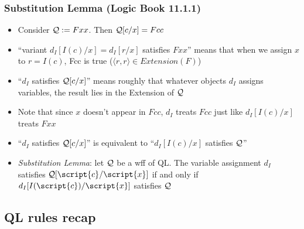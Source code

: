 \begin{frame}
\frametitle{Substitution Lemma (Logic Book 11.1.1)}

\begin{itemize}[<+->]

\item Consider $\metav{Q} := Fxx$. Then $\metav{Q}\substitute{x}{c} = Fcc$

\item  ``variant $d_I [I(c) /x]=d_I [r/x]$ satisfies $Fxx$'' means that when we assign $x$ to $r=I(c)$, Fcc is true ($\langle r, r \rangle \in Extension(F)$) %

\item ``$d_I$ satisfies $\metav{Q}\substitute{x}{c}$'' means roughly that whatever objects $d_I$ assigns variables, the result lies in the Extension of $\metav{Q}$

\item Note that since $x$ doesn't appear in $Fcc$, $d_I$ treats $Fcc$ just like $d_I [I(c) /x]$ treats $Fxx$




\item ``$d_I$ satisfies $\metav{Q}\substitute{x}{c}$'' is equivalent to ``$d_I [I(c) /x]$ satisfies $\metav{Q}$''

\item \emph{Substitution Lemma}: let $\metav{Q}$ be a wff of QL. The variable assignment $d_I$ satisfies $\metav{Q}\substitute{\script{x}}{\script{c}}$ if and only if $d_I [I(\script{c})/\script{x}]$ satisfies $\metav{Q}$



\end{itemize}
\end{frame}



\subsection{QL rules recap}

